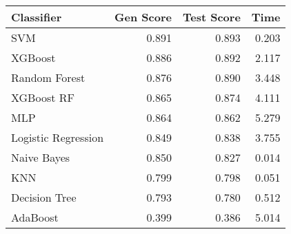 \begin{tabular}{lrrr}
\toprule
Classifier & Gen Score & Test Score & Time \\
\midrule
SVM & 0.891 & 0.893 & 0.203 \\
XGBoost & 0.886 & 0.892 & 2.117 \\
Random Forest & 0.876 & 0.890 & 3.448 \\
XGBoost RF & 0.865 & 0.874 & 4.111 \\
MLP & 0.864 & 0.862 & 5.279 \\
Logistic Regression & 0.849 & 0.838 & 3.755 \\
Naive Bayes & 0.850 & 0.827 & 0.014 \\
KNN & 0.799 & 0.798 & 0.051 \\
Decision Tree & 0.793 & 0.780 & 0.512 \\
AdaBoost & 0.399 & 0.386 & 5.014 \\
\bottomrule
\end{tabular}
